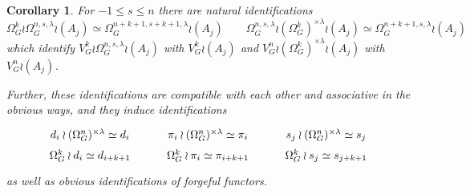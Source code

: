 \documentclass[a4paper,10pt
,draft
]{article}%
\numberwithin{equation}{section}
\numberwithin{figure}{section}
\newtheorem{corollary}[equation]{Corollary}%
\theoremstyle{definition} %
\newcommand{\1}{\ensuremath{\mathbbm 1}}%
\begin{document}
\begin{corollary}\label{LABIDEN COR}
For $-1 \leq s \leq n$ there are natural identifications
\[
	\Omega_G^{k} \wr \Omega_G^{n,s,\lambda} \wr (A_j) \simeq
	\Omega_G^{n+k+1,s+k+1,\lambda} \wr (A_j)
\qquad
	\Omega_G^{n,s,\lambda} \wr 
	(\Omega_G^k)^{\times \lambda}
	\wr (A_j)
\simeq
	\Omega_G^{n+k+1,s,\lambda} \wr (A_j)
\]
which identify 
$V^k_G \wr \Omega_G^{n,s,\lambda} \wr (A_j) $ with 
$V^k_G \wr (A_j) $
and 
$V_G^n \wr (\Omega_G^k)^{\times \lambda}\wr (A_j) $
with 
$V_G^n \wr (A_j)$.

Further, these identifications are compatible with each other and associative in the obvious ways, and they induce identifications
\[
\begin{tikzcd}[row sep =0]
	d_i \wr (\Omega_G^{n})^{\times \lambda} \simeq d_i 
&
	\pi_i \wr (\Omega_G^{n})^{\times \lambda} \simeq \pi_i 
&
	s_j \wr (\Omega_G^{n})^{\times \lambda} \simeq s_j 
\\
	\Omega_G^k \wr d_i \simeq d_{i+k+1} 
&
	\Omega_G^k \wr \pi_i \simeq \pi_{i+k+1} 
&
	\Omega_G^k \wr s_j \simeq s_{j+k+1}
\end{tikzcd}
\]
as well as obvious identifications of forgeful functors.
\end{corollary}
\end{document}
